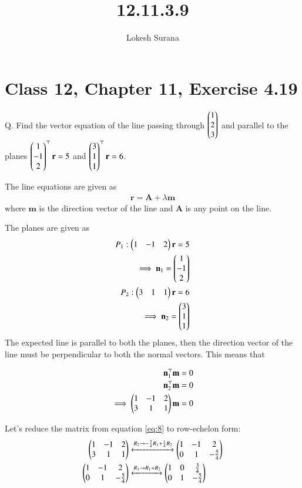 \documentclass[journal,12pt,twocolumn]{IEEEtran}
\renewcommand{\vec}[1]{\boldsymbol{\mathbf{#1}}}
\begin{document}
\vspace{3cm}
\title{12.11.3.9}
\author{Lokesh Surana}
\maketitle
\section*{Class 12, Chapter 11, Exercise 4.19}

Q. Find the vector equation of the line passing through $\begin{pmatrix}1\\2\\3\end{pmatrix}$ and parallel to the planes $\myvec{1\\-1\\2}^{\top}\vec{r} = 5$ and $\myvec{3\\1\\1}^{\top}\vec{r} = 6$.  

\solution
The line equations are given as
\begin{align}
    \label{eq:1} \vec{r} = \vec{A} + \lambda\vec{m}
\end{align}
where $\vec{m}$ is the direction vector of the line and $\vec{A}$ is any point on the line. 

The planes are given as
\begin{align}
    \label{eq:2} {P}_1: \myvec{1&-1&2}\vec{r} = 5 \\
    \label{eq:3} \implies \vec{n}_1 = \myvec{1\\-1\\2}\\
    \label{eq:4} {P}_2: \myvec{3&1&1}\vec{r} = 6 \\
    \label{eq:5} \implies \vec{n}_2 = \myvec{3\\1\\1}
\end{align}
The expected line is parallel to both the planes, then the direction vector of the line must be perpendicular to both the normal vectors. This means that

\begin{align}
    \label{eq:6} \vec{n}_1^{\top}\vec{m} = 0 \\
    \label{eq:7} \vec{n}_2^{\top}\vec{m} = 0 \\
    \label{eq:8} \implies \myvec{1&-1&2 \\ 3&1&1}\vec{m} = 0
\end{align}

Let's reduce the matrix from equation \eqref{eq:8} to row-echelon form:
\begin{align}
    \label{eq:9} \begin{pmatrix}1&-1&2 \\ 3&1&1\end{pmatrix} &\xleftrightarrow[]{R_2\rightarrow -\frac{3}{4}{R_1} + \frac{1}{4}{R_2}} \begin{pmatrix}1&-1&2 \\ 0&1&-\frac{5}{4}\end{pmatrix}\\
    \label{eq:10} \begin{pmatrix}1&-1&2 \\ 0&1&-\frac{5}{4}\end{pmatrix} &\xleftrightarrow[]{R_1\rightarrow {R_1} + {R_2}} \begin{pmatrix}1&0&\frac{3}{4} \\ 0&1&-\frac{5}{4}\end{pmatrix}
\end{align}
\end{document}
